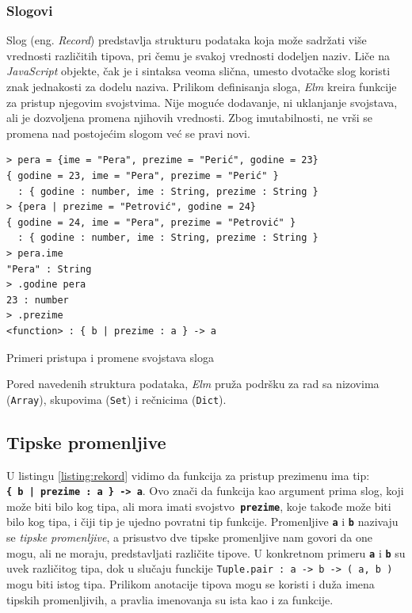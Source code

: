 \documentclass[12pt,oneside]{memoir}
\begin{document}
\subsubsection{Slogovi} 
Slog (eng. \emph{Record}) predstavlja strukturu podataka koja može sadržati više vrednosti različitih tipova, 
pri čemu je svakoj vrednosti dodeljen naziv. Liče na \emph{JavaScript} objekte, čak je i 
sintaksa veoma slična, umesto dvotačke slog koristi znak jednakosti za dodelu naziva.
Prilikom definisanja sloga, \emph{Elm} kreira funkcije za pristup njegovim svojstvima. Nije 
moguće dodavanje, ni uklanjanje svojstava, ali je dozvoljena promena njihovih vrednosti.
Zbog imutabilnosti, ne vrši se promena nad postojećim slogom već se pravi novi.
\begin{listing}[h]
\begin{verbatim}
> pera = {ime = "Pera", prezime = "Perić", godine = 23}
{ godine = 23, ime = "Pera", prezime = "Perić" } 
  : { godine : number, ime : String, prezime : String }
> {pera | prezime = "Petrović", godine = 24}
{ godine = 24, ime = "Pera", prezime = "Petrović" }
  : { godine : number, ime : String, prezime : String }
> pera.ime
"Pera" : String
> .godine pera
23 : number
> .prezime
<function> : { b | prezime : a } -> a
\end{verbatim}
\caption{Primeri pristupa i promene svojstava sloga}
\label{listing:rekord}
\end{listing}

Pored navedenih struktura podataka, \emph{Elm} pruža podršku za rad sa nizovima (\texttt{Array}),
skupovima (\texttt{Set}) i rečnicima (\texttt{Dict}).

\subsection{Tipske promenljive} 
U listingu \ref{listing:rekord} vidimo da funkcija za pristup prezimenu ima tip:\\ 
\texttt{\textbf{\{ b | prezime : a \} -> a}}. Ovo znači da funkcija kao argument
prima slog, koji može biti bilo kog tipa, ali mora imati svojstvo\texttt{\textbf{
prezime}}, koje takođe može biti bilo kog tipa, i čiji tip je ujedno povratni tip 
funkcije. Promenljive \texttt{\textbf{a}} i \texttt{\textbf{b}} nazivaju se 
\emph{tipske promenljive}, a prisustvo dve tipske promenljive nam govori da one mogu, 
ali ne moraju, predstavljati različite tipove. U konkretnom primeru \texttt{\textbf{a}}
i \texttt{\textbf{b}} su uvek različitog tipa, dok u slučaju funckije \texttt{Tuple.pair
: a -> b -> ( a, b )} mogu biti istog tipa. Prilikom anotacije tipova mogu se koristi i
duža imena tipskih promenljivih, a pravlia imenovanja su ista kao i za funkcije.
\end{document}
